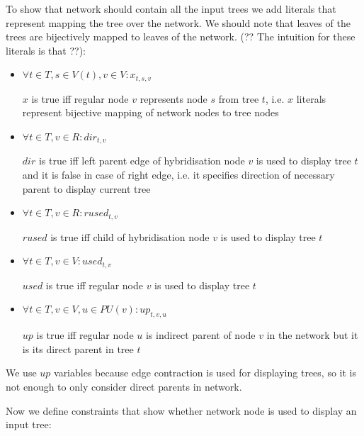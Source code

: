 \documentclass[runningheads, envcountsame, a4paper]{llncs}
\begin{document}
To show that network should contain all the input trees we add literals that represent mapping the tree over 
the network. We should note that leaves of the trees are bijectively mapped to leaves of the network. 
(?? The intuition for these literals is that ??):

\begin{itemize}

\item $\forall t \in T, s \in V(t), v \in V : x_{t,s,v}$

$x$ is true iff regular node $v$ represents node $s$ from tree $t$, i.e. $x$ literals represent bijective 
mapping of network nodes to tree nodes

\item $\forall t \in T, v \in R : dir_{t,v}$

$dir$ is true iff left parent edge of hybridisation node $v$ is used to display tree $t$ and it is false in case 
of right edge, i.e. it specifies direction of necessary parent to display current tree

\item $\forall t \in T, v \in R : rused_{t,v}$

$rused$ is true iff child of hybridisation node $v$ is used to display tree $t$

\item $\forall t \in T, v \in V : used_{t,v}$

$used$ is true iff regular node $v$ is used to display tree $t$

\item $\forall t \in T, v \in V, u \in PU(v) : up_{t,v,u}$

$up$ is true iff regular node $u$ is indirect parent of node $v$ in the network but it is its direct parent in tree $t$

\end{itemize}

We use $up$ variables because edge contraction is used for displaying trees, so it is not enough to only 
consider direct parents in network.

Now we define constraints that show whether network node is used to display an input tree:
\end{document}
